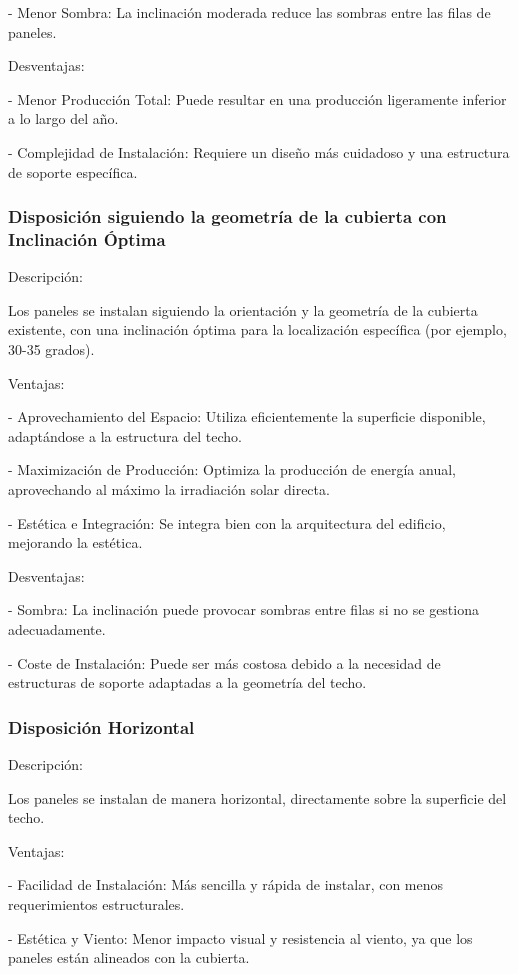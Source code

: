 \documentclass[a4paper,12pt]{article}
\begin{document}
\begin{Form}
    - Menor Sombra: La inclinación moderada reduce las sombras entre las filas de paneles.

Desventajas:

    - Menor Producción Total: Puede resultar en una producción ligeramente inferior a lo largo del año.

    - Complejidad de Instalación: Requiere un diseño más cuidadoso y una estructura de soporte específica.


\subsubsection*{Disposición siguiendo la geometría de la cubierta con Inclinación Óptima}
Descripción:

Los paneles se instalan siguiendo la orientación y la geometría de la cubierta existente, con una inclinación óptima para la localización específica (por ejemplo, 30-35 grados).

Ventajas:

- Aprovechamiento del Espacio: Utiliza eficientemente la superficie disponible, adaptándose a la estructura del techo.

- Maximización de Producción: Optimiza la producción de energía anual, aprovechando al máximo la irradiación solar directa.

- Estética e Integración: Se integra bien con la arquitectura del edificio, mejorando la estética.

Desventajas:

- Sombra: La inclinación puede provocar sombras entre filas si no se gestiona adecuadamente.

- Coste de Instalación: Puede ser más costosa debido a la necesidad de estructuras de soporte adaptadas a la geometría del techo.


\subsubsection*{Disposición Horizontal}
Descripción:

Los paneles se instalan de manera horizontal, directamente sobre la superficie del techo.


Ventajas:

- Facilidad de Instalación: Más sencilla y rápida de instalar, con menos requerimientos estructurales.

- Estética y Viento: Menor impacto visual y resistencia al viento, ya que los paneles están alineados con la cubierta.


\end{Form}
\end{document}
